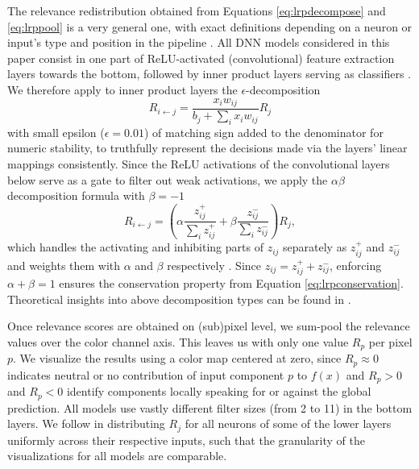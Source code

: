 \documentclass[10pt,twocolumn,letterpaper]{article}
\begin{document}
The relevance redistribution obtained from Equations \ref{eq:lrpdecompose} and \ref{eq:lrppool} is a very general one, with exact definitions depending on a neuron or input's type and position in the pipeline \cite{lapuschkin2016analyzing}. All DNN models considered in this paper consist in one part of ReLU-activated (convolutional) feature extraction layers towards the bottom, followed by inner product layers serving as classifiers \cite{NIPS2010_4061}. We therefore apply to inner product layers the $\epsilon$-decomposition
\begin{equation}
R_{i\leftarrow j} = \frac{x_iw_{ij}}{b_j + \sum_i x_iw_{ij}} R_j
\end{equation}
with small epsilon ($\epsilon=0.01$) of matching sign added to the denominator for numeric stability, to truthfully represent the decisions made via the layers' linear mappings consistently.
Since the ReLU activations of the convolutional layers below serve as a gate to filter out weak activations, we apply the $\alpha\beta$ decomposition formula with $\beta=-1$ \cite{bach2015pixel}
\begin{equation}
R_{i\leftarrow j} = \left(\alpha\frac{z^+_{ij}}{\sum_iz^+_{ij}} + \beta\frac{z^-_{ij}}{\sum_iz^-_{ij}}\right)R_j,
\end{equation}
which handles the activating and inhibiting parts of $z_{ij}$ separately as $z^+_{ij}$ and $z^-_{ij}$ and weights them with $\alpha$ and $\beta$ respectively \cite{bach2015pixel}. Since $z_{ij} = z^+_{ij} + z^-_{ij}$, enforcing $\alpha+\beta=1$ ensures the conservation property from Equation \ref{eq:lrpconservation}. Theoretical insights into above decomposition types can be found in \cite{MonPR17}.

Once relevance scores are obtained on (sub)pixel level, we sum-pool the relevance values over the color channel axis. This leaves us with only one value $R_p$ per pixel $p$. We visualize the results using a color map centered at zero, since $R_p \approx 0$ indicates neutral or no contribution of input component $p$ to $f(x)$ and $R_p > 0$ and $R_p < 0$ identify components locally speaking for or against the global prediction. All models use vastly different filter sizes (from 2 to 11) in the bottom layers. We follow \cite{BacICIP16} in distributing $R_j$ for all neurons of some of the lower layers uniformly across their respective inputs, such that the granularity of the visualizations for all models are comparable.
\end{document}
